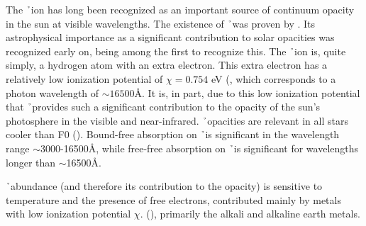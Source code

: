 
The \h\ ion has long been recognized as an important source of
continuum opacity in the sun at visible
wavelengths. The existence of \h\ was proven by \cite{bethe1929}. Its
astrophysical importance as a significant contribution to solar
opacities was recognized early on, \citet{Wildt1939a,Wildt1939b} being among the first to
recognize this.  The \h\ ion is, quite simply, a hydrogen atom with an extra electron.  This extra electron
has a relatively low ionization potential of $\chi = 0.754$ eV
(\citealt{carroll2007introduction}, which corresponds to a photon
wavelength of $\sim 16500$\AA.  It is, in part, due to this low
ionization potential that \h\ provides such  a significant contribution to the opacity of the sun's
photosphere in the visible and near-infrared.  \h\ opacities are relevant in all
stars cooler than F0 (\citealt{carroll2007introduction}). Bound-free
absorption on \h\ is significant in the wavelength range
$\sim$3000-16500\AA, while free-free absorption on \h\ is significant
for wavelengths longer than $\sim$16500\AA.  

 \h\ abundance (and therefore its contribution to the opacity) is sensitive 
to temperature and the presence of free electrons, contributed mainly
by metals with low ionization potential $\chi$.
(\citealt{hansen1994stellar}), primarily the alkali and alkaline earth
metals.  


